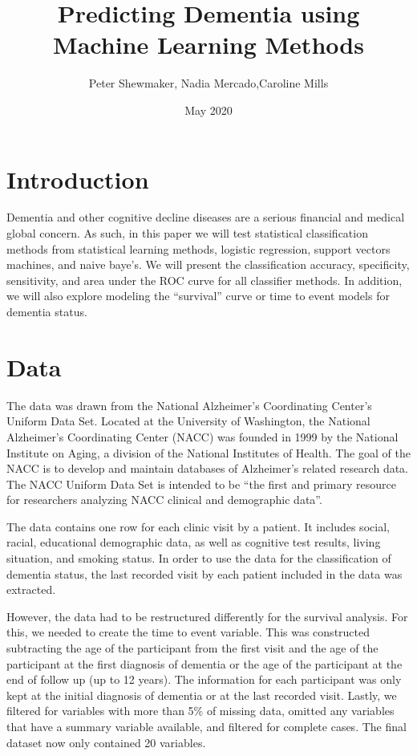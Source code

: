 \documentclass[a4paper,man,natbib,11pt]{article}
\title{Predicting Dementia using Machine Learning Methods}
\author{Peter Shewmaker, Nadia Mercado,Caroline Mills  }
\date{May 2020}
\begin{document}
\maketitle

\section{Introduction}

Dementia and other cognitive decline diseases are a serious financial and medical global concern. As such, in this paper we will test statistical classification methods from statistical learning methods, logistic regression, support vectors machines, and naive baye's. We will present the classification accuracy, specificity, sensitivity, and area under the ROC curve for all classifier methods. In addition, we will also explore modeling the ``survival'' curve or time to event models for dementia status. 

\section{Data}

The data was drawn from the National Alzheimer's Coordinating Center's Uniform Data Set. Located at the University of Washington, the National Alzheimer's Coordinating Center (NACC) was founded in 1999 by the National Institute on Aging, a division of the National Institutes of Health. The goal of the NACC is to develop and maintain databases of Alzheimer's related research data. The NACC Uniform Data Set is intended to be ``the first and primary resource for researchers analyzing NACC clinical and demographic data''.

The data contains one row for each clinic visit by a patient. It includes social, racial, educational demographic data, as well as cognitive test results, living situation, and smoking status. In order to use the data for the classification of dementia status, the last recorded visit by each patient included in the data was extracted.

However, the data had to be restructured differently for the survival analysis. For this, we needed to create the time to event variable. This was constructed subtracting the age of the participant from the first visit and the age of the participant at the first diagnosis of dementia or the age of the participant at the end of follow up (up to 12 years). The information for each participant was only kept at the initial diagnosis of dementia or at the last recorded visit. Lastly, we filtered for variables with more than 5\% of missing data, omitted any variables that have a summary variable available, and filtered for complete cases. The final dataset now only contained 20 variables.
\end{document}
